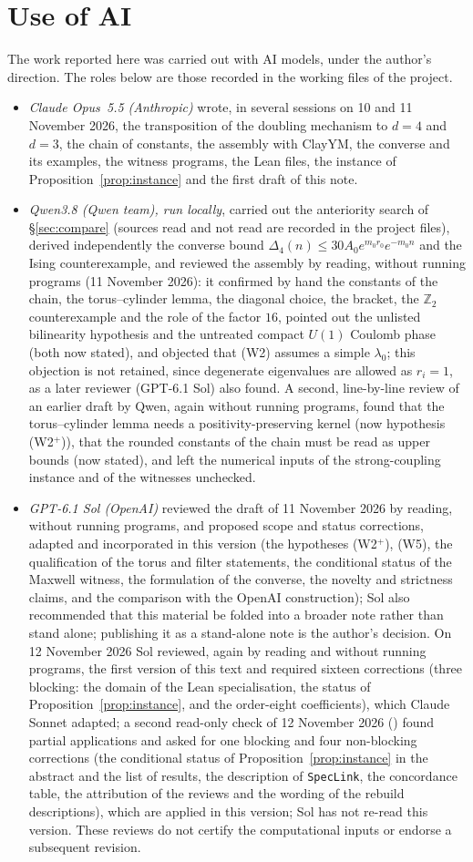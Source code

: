 \documentclass[11pt,a4paper]{article}
\theoremstyle{plain}
\theoremstyle{definition}
\theoremstyle{remark}
\numberwithin{equation}{section}
\newcommand{\Z}{\mathbb{Z}}
\newcommand{\REVIEWSTATUS}{reviewed the assembly by reading, without running programs (11 November 2026): it confirmed by hand the constants of the chain, the torus--cylinder lemma, the diagonal choice, the bracket, the $\Z_2$ counterexample and the role of the factor $16$, pointed out the unlisted bilinearity hypothesis and the untreated compact $U(1)$ Coulomb phase (both now stated), and objected that (W2) assumes a simple $\lambda_0$; this objection is not retained, since degenerate eigenvalues are allowed as $r_i=1$, as a later reviewer (GPT-6.1 Sol) also found. A second, line-by-line review of an earlier draft by Qwen, again without running programs, found that the torus--cylinder lemma needs a positivity-preserving kernel (now hypothesis (W2$^+$)), that the rounded constants of the chain must be read as upper bounds (now stated), and left the numerical inputs of the strong-coupling instance and of the witnesses unchecked.}
\begin{document}
\section*{Use of AI}\label{sec:ai}
The work reported here was carried out with AI models, under the author's direction. The roles below are those recorded in the working
files of the project.
\begin{itemize}
\item \emph{Claude Opus~5.5 (Anthropic)} wrote, in several sessions on 10 and 11 November 2026, the transposition of the doubling mechanism to
$d=4$ and $d=3$, the chain of constants, the assembly with ClayYM, the converse and its examples, the witness programs, the Lean files, the
instance of Proposition~\ref{prop:instance} and the first draft of this note.
\item \emph{Qwen3.8 (Qwen team), run locally}, carried out the anteriority search of \S\ref{sec:compare} (sources read and not read are
recorded in the project files), derived independently the converse bound $\Delta_4(n)\le30A_0e^{m_0r_0}e^{-m_0n}$ and the Ising
counterexample, and \REVIEWSTATUS
\item \emph{GPT-6.1 Sol (OpenAI)} reviewed the draft of 11 November 2026 by reading, without running programs, and proposed scope and status
corrections, adapted and incorporated in this version (the hypotheses (W2$^+$), (W5), the qualification of the torus and filter statements, the
conditional status of the Maxwell witness, the formulation of the converse, the novelty and strictness claims, and the comparison with the OpenAI
construction); Sol also recommended that this material be folded into a broader note rather than stand alone; publishing it as a stand-alone note is the author's decision. On 12 November 2026 Sol reviewed, again by reading and without running programs, the first version of this text and required sixteen corrections (three blocking: the domain of the Lean specialisation, the status of Proposition~\ref{prop:instance}, and the order-eight coefficients), which Claude Sonnet adapted; a second read-only check of 12 November 2026 () found partial applications and asked for one blocking and four non-blocking corrections (the conditional status of Proposition~\ref{prop:instance} in the abstract and the list of results, the description of \texttt{SpecLink}, the concordance table, the attribution of the reviews and the wording of the rebuild descriptions), which are applied in this version; Sol has not re-read this version. These reviews do not certify the computational inputs or endorse a subsequent revision.

\end{itemize}
\end{document}
